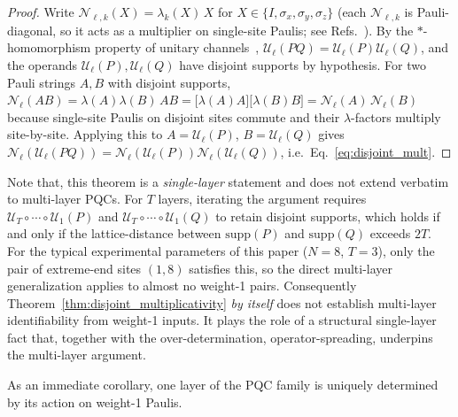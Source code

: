 \documentclass[%
 reprint,
superscriptaddress,
 amsmath,amssymb,
 aps,
]{revtex4-2}
\begin{document}
\begin{proof}
Write $\mathcal{N}_{\ell,k}(X) = \lambda_k(X)\,X$ for $X\in\{I,\sigma_x,\sigma_y,\sigma_z\}$ (each $\mathcal{N}_{\ell,k}$ is Pauli-diagonal, so it acts as a multiplier on single-site Paulis; see Refs.~\cite{nielsen2002simple,magesan2012characterizing,flammia2020pauli}). By the $*$-homomorphism property of unitary channels~\cite{nielsen2010quantum,watrous2018theory}, $\mathcal{U}_\ell(PQ)=\mathcal{U}_\ell(P)\mathcal{U}_\ell(Q)$, and the operands $\mathcal{U}_\ell(P),\mathcal{U}_\ell(Q)$ have disjoint supports by hypothesis. For two Pauli strings $A,B$ with disjoint supports, $\mathcal{N}_\ell(AB) = \lambda(A)\lambda(B)\,AB = \bigl[\lambda(A)A\bigr]\bigl[\lambda(B)B\bigr] = \mathcal{N}_\ell(A)\,\mathcal{N}_\ell(B)$ because single-site Paulis on disjoint sites commute and their $\lambda$-factors multiply site-by-site. Applying this to $A=\mathcal{U}_\ell(P)$, $B=\mathcal{U}_\ell(Q)$ gives $\mathcal{N}_\ell(\mathcal{U}_\ell(PQ))=\mathcal{N}_\ell(\mathcal{U}_\ell(P))\mathcal{N}_\ell(\mathcal{U}_\ell(Q))$, i.e.\ Eq.~\eqref{eq:disjoint_mult}.
\end{proof}

Note that, this theorem is a \emph{single-layer} statement and does not extend verbatim to multi-layer PQCs. For $T$ layers, iterating the argument requires $\mathcal{U}_T\circ\cdots\circ\mathcal{U}_1(P)$ and $\mathcal{U}_T\circ\cdots\circ\mathcal{U}_1(Q)$ to retain disjoint supports, which holds if and only if the lattice-distance between $\mathrm{supp}(P)$ and $\mathrm{supp}(Q)$ exceeds $2T$. For the typical experimental parameters of this paper ($N=8$, $T=3$), only the pair of extreme-end sites $(1,8)$ satisfies this, so the direct multi-layer generalization applies to almost no weight-1 pairs. Consequently Theorem~\ref{thm:disjoint_multiplicativity} \emph{by itself} does not establish multi-layer identifiability from weight-1 inputs. It plays the role of a structural single-layer fact that, together with the over-determination, operator-spreading, underpins the multi-layer argument.

As an immediate corollary, one layer of the PQC family is uniquely determined by its action on weight-1 Paulis.
\end{document}
